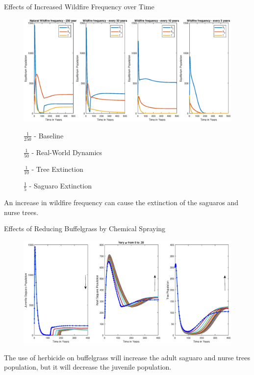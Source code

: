 \documentclass{beamer}
\begin{document}
\begin{frame}{Effects of Increased Wildfire Frequency over Time}
\begin{figure}
{\vspace{-.5cm}\includegraphics[scale = 0.3]{IncreasingWildfireFrequancy.eps}
}
\vspace{-1cm}
\begin{center}
\begin{minipage}{.2\linewidth}
\tiny{\hspace{.5cm}$\displaystyle\frac{1}{250}$ - Baseline}
\end{minipage}
\begin{minipage}{.25\linewidth}
\tiny{$\displaystyle\frac{1}{50}$ - Real-World Dynamics}
\end{minipage}
\begin{minipage}{.2\linewidth}
\tiny{$\displaystyle\frac{1}{10}$ - Tree Extinction}
\end{minipage}
\begin{minipage}{.2\linewidth}
\tiny{$\displaystyle\frac{1}{5}$ - Saguaro Extinction}
\end{minipage}
\end{center}
\end{figure}
An increase in wildfire frequency can cause the extinction of the saguaros and nurse trees.
\end{frame}

\begin{frame}{Effects of Reducing Buffelgrass by Chemical Spraying}

{\footnotesize \begin{figure}
{\vspace{-.5cm}\includegraphics[scale = 0.3]{VaryOmegaWbuffel.eps}}
\end{figure}
The use of herbicide on buffelgrass will increase the adult saguaro and nurse trees population, but it will decrease the juvenile population.} 
\end{frame}
\end{document}
